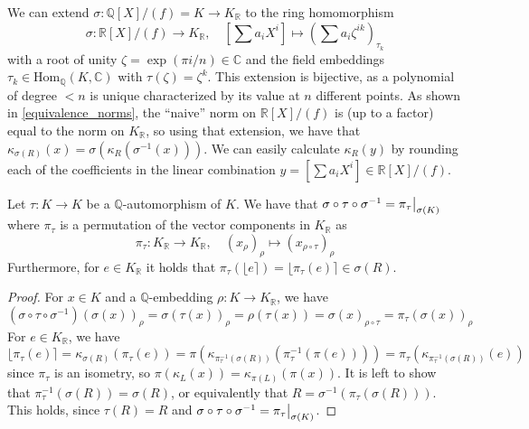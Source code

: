 \documentclass{report}
\newcommand{\R}{\mathbb{R}}
\newcommand\restr[2]{{
	\left.\kern-\nulldelimiterspace
	#1
	\vphantom{\big|}
	\right|_{#2}
}}
\begin{document}
We can extend $\sigma: \mathbb{Q}[X] / (f) = K \to K_\R$ to the ring homomorphism
\begin{equation}
\sigma: \R[X] / (f) \to K_\R, \quad \left[ \sum a_i X^i \right] \mapsto \left( \sum a_i \zeta^{ik} \right)_{\tau_k} \nonumber
\end{equation}
with a root of unity $\zeta = \exp(\pi i / n) \in \mathbb{C}$ and the field embeddings $\tau_k \in \mathrm{Hom}_{\mathbb{Q}}(K, \mathbb{C})$ with $\tau(\zeta) = \zeta^k$. This extension is bijective, as a polynomial of degree $< n$ is unique characterized by its value at $n$ different points. As shown in \ref{equivalence_norms}, the ``naive'' norm on $\R[X] / (f)$ is (up to a factor) equal to the norm on $K_\R$, so using that extension, we have that $\kappa_{\sigma(R)}(x) = \sigma(\kappa_R(\sigma^{-1}(x)))$. We can easily calculate $\kappa_R(y)$ by rounding each of the coefficients in the linear combination $y = [\sum a_i X^i] \in \R[X] / (f)$.

\lemma
\label{rounding_kr_commutes}
Let $\tau: K \to K$ be a $\mathbb{Q}$-automorphism of $K$. We have that $\sigma \circ \tau \circ \sigma^{-1} = \restr{\pi_\tau}{\sigma(K)}$ where $\pi_\tau$ is a permutation of the vector components in $K_\R$ as
\begin{equation}
\pi_\tau: K_\R \to K_\R, \quad (x_\rho)_\rho \mapsto (x_{\rho \circ \tau})_\rho \nonumber
\end{equation}
Furthermore, for $e \in K_\R$ it holds that $\pi_\tau(\lfloor e \rceil) = \lfloor \pi_\tau(e) \rceil \in \sigma(R)$.

\begin{proof}
For $x \in K$ and a $\mathbb{Q}$-embedding $\rho: K \to K_\R$, we have
\begin{equation}
(\sigma \circ \tau \circ \sigma^{-1})(\sigma(x))_\rho = \sigma(\tau(x))_\rho = \rho(\tau(x)) = \sigma(x)_{\rho \circ \tau} = \pi_\tau(\sigma(x))_\rho \nonumber
\end{equation}
For $e \in K_\R$, we have
\begin{equation}
\lfloor \pi_\tau(e) \rceil = \kappa_{\sigma(R)}(\pi_\tau(e)) = \pi(\kappa_{\pi_\tau^{-1}(\sigma(R))}(\pi_\tau^{-1}(\pi(e)))) = \pi_\tau(\kappa_{\pi_\tau^{-1}(\sigma(R))}(e)) \nonumber
\end{equation}
since $\pi_\tau$ is an isometry, so $\pi(\kappa_L(x)) = \kappa_{\pi(L)}(\pi(x))$. It is left to show that $\pi_\tau^{-1}(\sigma(R)) = \sigma(R)$, or equivalently that $R = \sigma^{-1}(\pi_\tau(\sigma(R)))$. This holds, since $\tau(R) = R$ and $\sigma \circ \tau \circ \sigma^{-1} = \restr{\pi_\tau}{\sigma(K)}$.\qedhere
\end{proof}
\end{document}

